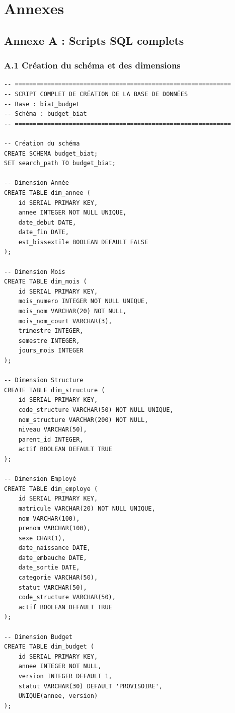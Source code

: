 \chapter*{Annexes}

\sloppy %

\section*{Annexe A : Scripts SQL complets}

\subsection*{A.1 Création du schéma et des dimensions}

\begin{verbatim}
-- ============================================================
-- SCRIPT COMPLET DE CRÉATION DE LA BASE DE DONNÉES
-- Base : biat_budget
-- Schéma : budget_biat
-- ============================================================

-- Création du schéma
CREATE SCHEMA budget_biat;
SET search_path TO budget_biat;

-- Dimension Année
CREATE TABLE dim_annee (
    id SERIAL PRIMARY KEY,
    annee INTEGER NOT NULL UNIQUE,
    date_debut DATE,
    date_fin DATE,
    est_bissextile BOOLEAN DEFAULT FALSE
);

-- Dimension Mois
CREATE TABLE dim_mois (
    id SERIAL PRIMARY KEY,
    mois_numero INTEGER NOT NULL UNIQUE,
    mois_nom VARCHAR(20) NOT NULL,
    mois_nom_court VARCHAR(3),
    trimestre INTEGER,
    semestre INTEGER,
    jours_mois INTEGER
);

-- Dimension Structure
CREATE TABLE dim_structure (
    id SERIAL PRIMARY KEY,
    code_structure VARCHAR(50) NOT NULL UNIQUE,
    nom_structure VARCHAR(200) NOT NULL,
    niveau VARCHAR(50),
    parent_id INTEGER,
    actif BOOLEAN DEFAULT TRUE
);

-- Dimension Employé
CREATE TABLE dim_employe (
    id SERIAL PRIMARY KEY,
    matricule VARCHAR(20) NOT NULL UNIQUE,
    nom VARCHAR(100),
    prenom VARCHAR(100),
    sexe CHAR(1),
    date_naissance DATE,
    date_embauche DATE,
    date_sortie DATE,
    categorie VARCHAR(50),
    statut VARCHAR(50),
    code_structure VARCHAR(50),
    actif BOOLEAN DEFAULT TRUE
);

-- Dimension Budget
CREATE TABLE dim_budget (
    id SERIAL PRIMARY KEY,
    annee INTEGER NOT NULL,
    version INTEGER DEFAULT 1,
    statut VARCHAR(30) DEFAULT 'PROVISOIRE',
    UNIQUE(annee, version)
);
\end{verbatim}

